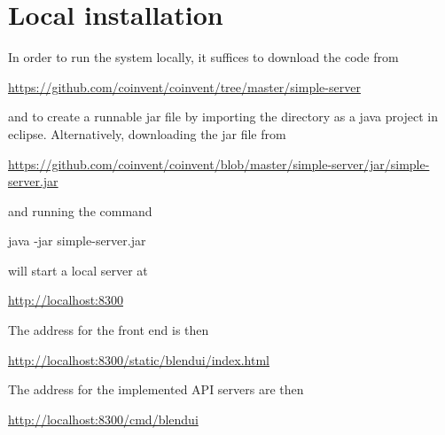 \section{Local installation} \label{sec:inst}

In order to run the system locally, it suffices to download the code from \mbox{}\\
\begin{center}
\url{https://github.com/coinvent/coinvent/tree/master/simple-server}
\end{center}
and to create a runnable jar file by importing the directory as a java project in eclipse. Alternatively, downloading the jar file from \mbox{}\\
\begin{center}
\url{https://github.com/coinvent/coinvent/blob/master/simple-server/jar/simple-server.jar}
\end{center}
and running the command
\begin{center}
java -jar simple-server.jar
\end{center}
\noindent will start a local server at \mbox{}\\
\begin{center}
\url{http://localhost:8300}
\end{center}
The address for the front end is then\mbox{}\\
\begin{center}
\url{http://localhost:8300/static/blendui/index.html}
\end{center}
The address for the  implemented API servers are then\mbox{}\\
\begin{center}
\url{http://localhost:8300/cmd/blendui}\mbox{}\\
\end{center}